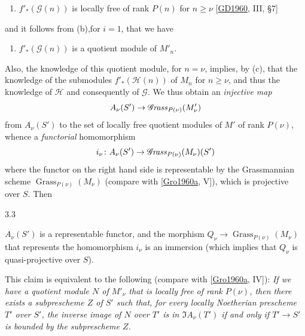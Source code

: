   
 \begin{enumerate}
    
 \item[a'.]
      \(f'_*(\mathscr {G} (n))\) is locally free of rank \(P(n)\) for \(n\geqslant \nu \) [\hyperref[GD1960]{GD1960}, III, §7]
    

  \end{enumerate}


  and it follows from (b),for \(i=1\), that we have

  
 \begin{enumerate}
    
 \item[a''.]
      \(f'_*(\mathscr {G} (n))\) is a quotient module of \(M'_n\).
    

  \end{enumerate}


  Also, the knowledge of this quotient module, for \(n=\nu \), implies, by (c), that the knowledge of the submodules \(f'_*(\mathscr {H} (n))\) of \(M_n\) for \(n\geqslant \nu \), and thus the knowledge of \(\mathscr {H}\) and consequently of \(\mathscr {G}\).
  We thus obtain an \emph{injective map}
  \[     A_\nu (S') \to  \mathscr {G}\kern  -1.25pt\mathit {rass}_{P(\nu )} (M'_\nu )   \]
  from \(A_\nu (S')\) to the set of locally free quotient modules of \(M'\) of rank \(P(\nu )\), whence a \emph{functorial} homomorphism
  \[     i_\nu \colon  A_\nu (S') \to  \mathscr {G}\kern  -1.25pt\mathit {rass}_{P(\nu )} (M_\nu )(S')   \]
  where the functor on the right hand side is representable by the Grassmannian scheme \(\operatorname {Grass}_{P(\nu )} (M_\nu )\) (compare with [\hyperref[Gro1960a]{Gro1960a}, V]), which is projective over \(S\).
  Then\begin{lemma}{3.3}\label{fga3.iv-3-lemma-3.3}\skipsinglepar\par{}\(A_\nu (S')\) is a representable functor, and the morphism \(Q_\nu \to \operatorname {Grass}_{P(\nu )} (M_\nu )\) that represents the homomorphism \(i_\nu \) is an immersion (which implies that \(Q_\nu \) is quasi-projective over \(S\)).\end{lemma}\par{}This claim is equivalent to the following (compare with [\hyperref[Gro1960a]{Gro1960a}, IV]):
  \emph{If we have a quotient module \(N\) of \(M'_\nu \) that is locally free of rank \(P(\nu )\), then there exists a subprescheme \(Z\) of \(S'\) such that, for every locally Noetherian prescheme \(T'\) over \(S'\), the inverse image of \(N\) over \(T'\) is in \(\Im  A_\nu (T')\) if and only if \(T'\to  S'\) is bounded by the subprescheme \(Z\).}
  
